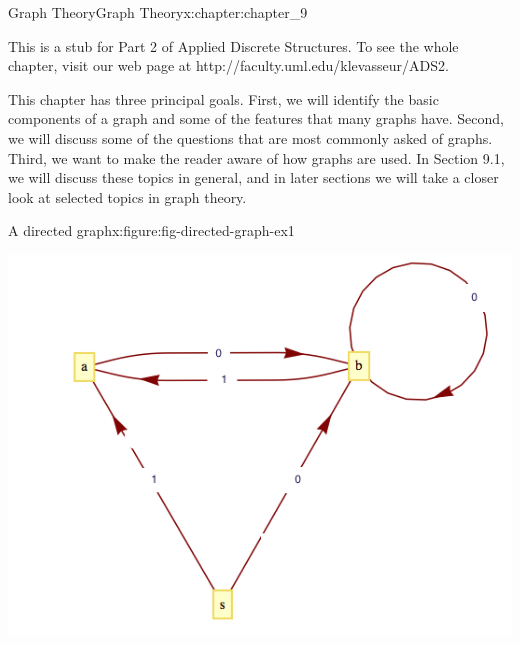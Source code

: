 \documentclass[twoside,10pt,]{book}
\numberwithin{equation}{section}
\begin{document}
\begin{chapterptx}{Graph Theory}{}{Graph Theory}{}{}{x:chapter:chapter_9}
\begin{introduction}{}%
This is a stub for Part 2 of Applied Discrete Structures. To see the whole chapter, visit our web page at http:\slash{}\slash{}faculty.uml.edu\slash{}klevasseur\slash{}ADS2.%
\par
This chapter has three principal goals. First, we will identify the basic components of a graph and some of the features that many graphs have. Second, we will discuss some of the questions that are most commonly asked of graphs. Third, we want to make the reader aware of how graphs are used. In Section 9.1, we will discuss these topics in general, and in later sections we will take a closer look at selected topics in graph theory.%
\end{introduction}%
\begin{figureptx}{A directed graph}{x:figure:fig-directed-graph-ex1}{}%
\begin{image}{0.125}{0.75}{0.125}%
\includegraphics[width=\linewidth]{images/fig-directed-graph-ex1.png}
\end{image}%
\tcblower
\end{figureptx}%
\end{chapterptx}
%
%
\typeout{************************************************}
\typeout{************************************************}
%
\end{document}
